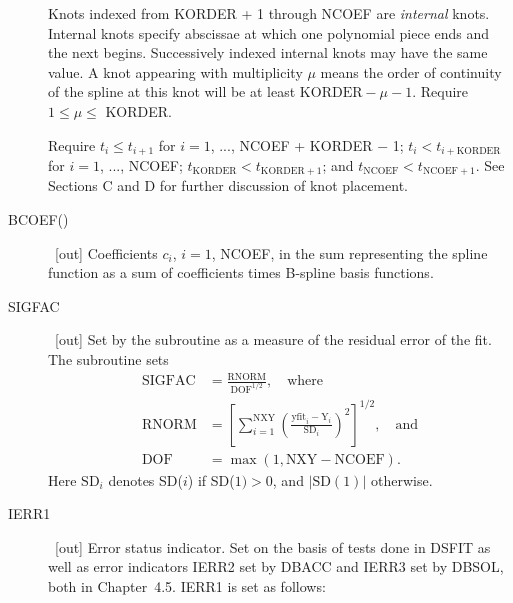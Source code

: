 \documentclass[twoside]{MATH77}
\begin{document}
\begin{description}
Knots indexed from KORDER + 1 through NCOEF are {\em internal} knots. Internal
knots specify abscissae at which one polynomial piece ends and the next
begins. Successively indexed internal knots may have the same value. A knot
appearing with multiplicity $\mu $ means the order of continuity of the
spline at this knot will be at least $\text{KORDER}-\mu - 1$. Require $1\leq
\mu \leq $ KORDER.

Require $t_i\leq t_{i+1}$ for $i=1$, ..., NCOEF + KORDER $-$ 1; $t_i<t_{i+%
\text{KORDER}}$ for $i=1$, ..., NCOEF; $t_{\text{KORDER}}<t_{\text{KORDER}%
+1} $; and $t_{\text{NCOEF}}<t_{\text{NCOEF}+1}$. See Sections C and D for
further discussion of knot placement.

\item[BCOEF()]  \ [out] Coefficients $c_i$, $i=1$, NCOEF, in the sum
representing the spline function as a sum of coefficients times B-spline
basis functions.

\item[SIGFAC]  \ [out] Set by the subroutine as a measure of the residual
error of the fit. The subroutine sets%
\begin{align*}
\text{SIGFAC}&=\frac{\text{RNORM}}{\text{DOF}^{1/2}},\quad \text{where}\\
\text{RNORM}&=\left[ \sum_{i=1}^{\text{NXY}}\left(\frac{\text{yfit}_i-\text{Y}_i}
{\text{SD}_i}\right) ^2\right] ^{1/2},\quad \text{and}\\
\text{DOF}&=\max (1,\text{NXY}-\text{NCOEF}).
\end{align*}
Here $\text{SD}_i$ denotes SD($i$) if SD($1)>0$, and $|\text{SD}(1)|$ otherwise.

\item[IERR1]  \ [out] Error status indicator. Set on the basis of tests done
in DSFIT as well as error indicators IERR2 set by DBACC and IERR3 set by
DBSOL, both in Chapter~4.5. IERR1 is set as follows:


\end{description}
\end{document}
